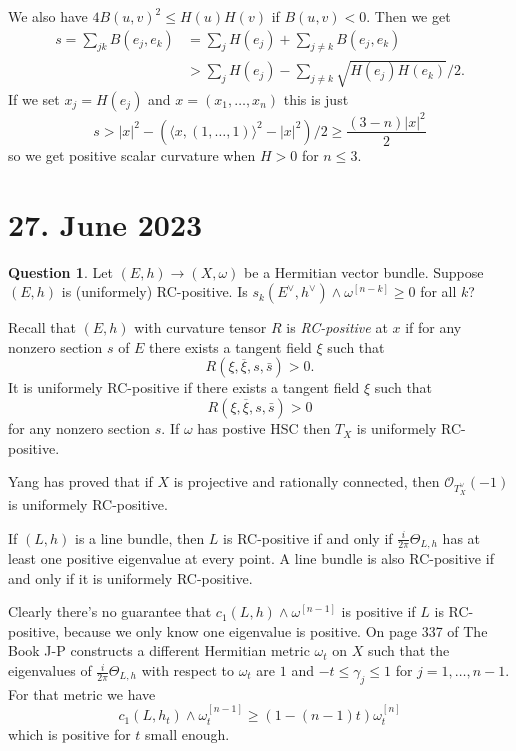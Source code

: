 \documentclass[11pt]{article}
\theoremstyle{definition}
\newcommand{\cc}[1]{\mathcal{#1}}
\def\^#1{^{[#1]}}
\def\ov#1{\overline{#1}}
\def\<{\langle}
\def\>{\rangle}
\newtheorem{question}{Question}
\begin{document}
We also have $4 B(u,v)^2 \leq H(u) H(v)$ if $B(u,v) < 0$.
Then we get
\begin{align*}
s
= \sum_{jk} B(e_j, e_k)
&= \sum_{j} H(e_j) + \sum_{j\not=k} B(e_j,e_k)
\\
&> \sum_{j} H(e_j) - \sum_{j\not=k} \sqrt{H(e_j) H(e_k)}/2.
\end{align*}
If we set $x_j = H(e_j)$ and $x = (x_1, \ldots, x_n)$ this is just
$$
s > |x|^2 - (\<x, (1, \ldots, 1)\>^2 - |x|^2)/2
\geq \frac{(3 - n)|x|^2}{2}
$$
so we get positive scalar curvature when $H > 0$ for $n \leq 3$.




\section{27. June 2023}

\begin{question}
Let $(E,h) \to (X,\omega)$ be a Hermitian vector bundle.
Suppose $(E,h)$ is (uniformely) RC-positive.
Is $s_k(E^\vee, h^\vee) \wedge \omega\^{n-k} \geq 0$ for all $k$?
\end{question}

Recall that $(E,h)$ with curvature tensor $R$ is \emph{RC-positive} at $x$ if
for any nonzero section $s$ of $E$ there exists a tangent field $\xi$ such that
$$
R(\xi, \ov\xi, s, \bar s) > 0.
$$
It is uniformely RC-positive if there exists a tangent field $\xi$ such that
$$
R(\xi, \ov\xi, s, \bar s) > 0
$$
for any nonzero section $s$.
If $\omega$ has postive HSC then $T_X$ is uniformely RC-positive.

Yang has proved that if $X$ is projective and rationally connected, then
$\cc O_{T_X^\vee}(-1)$ is uniformely RC-positive.

If $(L,h)$ is a line bundle, then $L$ is RC-positive if and only if $\frac
i{2\pi} \Theta_{L,h}$ has at least one positive eigenvalue at every point.
A line bundle is also RC-positive if and only if it is uniformely RC-positive.

Clearly there's no guarantee that $c_1(L,h) \wedge \omega\^{n-1}$ is positive
if $L$ is RC-positive, because we only know one eigenvalue is positive.
On page 337 of The Book J-P constructs a different Hermitian metric $\omega_t$
on $X$ such that the eigenvalues of $\frac{i}{2\pi}\Theta_{L,h}$ with respect
to $\omega_t$ are $1$ and $-t \leq \gamma_j \leq 1$ for $j
= 1, \ldots, n-1$. For that metric we have
$$
c_1(L,h_t) \wedge \omega_t\^{n-1} \geq (1-(n-1)t) \omega_t\^n
$$
which is positive for $t$ small enough.
\end{document}
